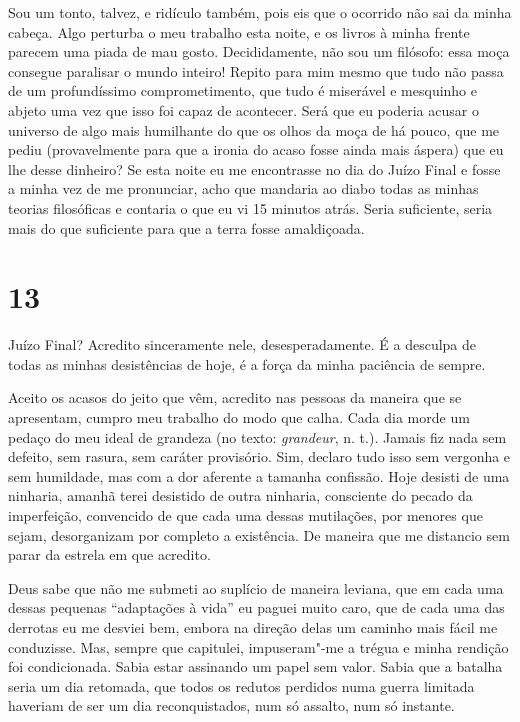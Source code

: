 Sou um tonto, talvez, e ridículo também, pois eis que o ocorrido não sai
da minha cabeça. Algo perturba o meu trabalho esta noite, e os livros à
minha frente parecem uma piada de mau gosto. Decididamente, não sou um
filósofo: essa moça consegue paralisar o mundo inteiro! Repito para mim
mesmo que tudo não passa de um profundíssimo comprometimento, que tudo é
miserável e mesquinho e abjeto uma vez que isso foi capaz de acontecer.
Será que eu poderia acusar o universo de algo mais humilhante do que os
olhos da moça de há pouco, que me pediu (provavelmente para que a ironia
do acaso fosse ainda mais áspera) que eu lhe desse dinheiro? Se esta
noite eu me encontrasse no dia do Juízo Final e fosse a minha vez de me
pronunciar, acho que mandaria ao diabo todas as minhas teorias
filosóficas e contaria o que eu vi 15 minutos atrás. Seria suficiente,
seria mais do que suficiente para que a terra fosse amaldiçoada.

\section{13}

Juízo Final? Acredito sinceramente nele, desesperadamente. É a desculpa
de todas as minhas desistências de hoje, é a força da minha paciência de
sempre.

Aceito os acasos do jeito que vêm, acredito nas pessoas da maneira que
se apresentam, cumpro meu trabalho do modo que calha. Cada dia morde um
pedaço do meu ideal de grandeza (no texto: \emph{grandeur}, n. t.).
Jamais fiz nada sem defeito, sem rasura, sem caráter provisório. Sim,
declaro tudo isso sem vergonha e sem humildade, mas com a dor aferente a
tamanha confissão. Hoje desisti de uma ninharia, amanhã terei desistido
de outra ninharia, consciente do pecado da imperfeição, convencido de
que cada uma dessas mutilações, por menores que sejam, desorganizam por
completo a existência. De maneira que me distancio sem parar da estrela
em que acredito.

Deus sabe que não me submeti ao suplício de maneira leviana, que em cada
uma dessas pequenas ``adaptações à vida'' eu paguei muito caro, que de
cada uma das derrotas eu me desviei bem, embora na direção delas um
caminho mais fácil me conduzisse. Mas, sempre que capitulei,
impuseram"-me a trégua e minha rendição foi condicionada. Sabia estar
assinando um papel sem valor. Sabia que a batalha seria um dia retomada,
que todos os redutos perdidos numa guerra limitada haveriam de ser um
dia reconquistados, num só assalto, num só instante.

